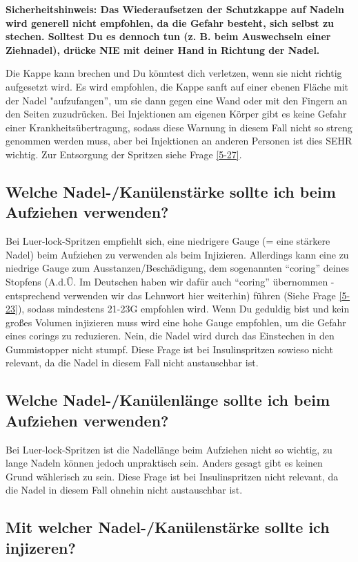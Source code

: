\documentclass{article}
\begin{document}
{\textbf{Sicherheitshinweis: Das Wiederaufsetzen der Schutzkappe auf Nadeln wird generell nicht empfohlen, da die Gefahr besteht, sich selbst zu stechen. Solltest Du es dennoch tun (z. B. beim Auswechseln einer Ziehnadel), drücke NIE mit deiner Hand in Richtung der Nadel.}

Die Kappe kann brechen und Du könntest dich verletzen, wenn sie nicht richtig aufgesetzt wird. Es wird empfohlen, die Kappe sanft auf einer ebenen Fläche mit der Nadel "aufzufangen”, um sie dann gegen eine Wand oder mit den Fingern an den Seiten zuzudrücken. Bei Injektionen am eigenen Körper gibt es keine Gefahr einer Krankheitsübertragung, sodass diese Warnung in diesem Fall nicht so streng genommen werden muss, aber bei Injektionen an anderen Personen ist dies SEHR wichtig. Zur Entsorgung der Spritzen siehe Frage \ref{5-27}.

\subsection{Welche Nadel-/Kanülenstärke sollte ich beim Aufziehen verwenden?}

Bei Luer-lock-Spritzen empfiehlt sich, eine niedrigere Gauge (= eine stärkere Nadel) beim Aufziehen zu verwenden als beim Injizieren. Allerdings kann eine zu niedrige Gauge zum Ausstanzen/Beschädigung, dem sogenannten “coring” deines Stopfens (A.d.Ü. Im Deutschen haben wir dafür auch “coring” übernommen - entsprechend verwenden wir das Lehnwort hier weiterhin) führen (Siehe Frage \ref{5-23}), sodass mindestens 21-23G empfohlen wird. Wenn Du geduldig bist und kein großes Volumen injizieren muss wird eine hohe Gauge empfohlen, um die Gefahr eines corings zu reduzieren. Nein, die Nadel wird durch das Einstechen in den Gummistopper nicht stumpf. Diese Frage ist bei Insulinspritzen sowieso nicht relevant, da die Nadel in diesem Fall nicht austauschbar ist.

\subsection{Welche Nadel-/Kanülenlänge sollte ich beim Aufziehen verwenden?}

Bei Luer-lock-Spritzen ist die Nadellänge beim Aufziehen nicht so wichtig, zu lange Nadeln können jedoch unpraktisch sein. Anders gesagt gibt es keinen Grund wählerisch zu sein. Diese Frage ist bei Insulinspritzen nicht relevant, da die Nadel in diesem Fall ohnehin nicht austauschbar ist.

\subsection{Mit welcher Nadel-/Kanülenstärke sollte ich injizeren?}\label{5-16}

}
\end{document}
